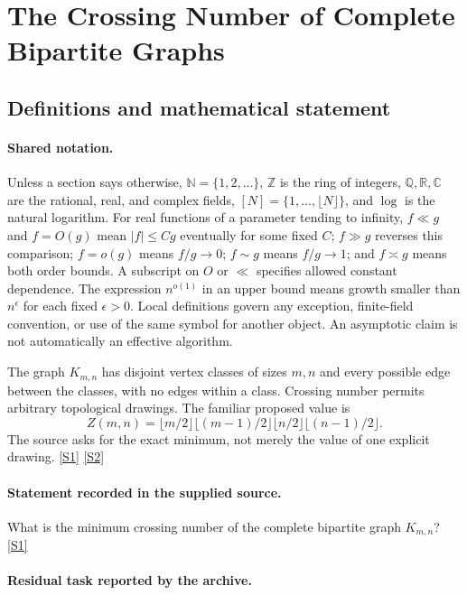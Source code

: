 \documentclass[11pt,a4paper]{article}
\newcommand{\N}{\mathbb{N}}
\newcommand{\Z}{\mathbb{Z}}
\newcommand{\Q}{\mathbb{Q}}
\newcommand{\R}{\mathbb{R}}
\newcommand{\C}{\mathbb{C}}
\newcommand{\sref}[2]{\hyperlink{source:#1:#2}{[S#2]}}
\begin{document}
\section{The Crossing Number of Complete Bipartite Graphs}\label{statement}


\subsection{Definitions and mathematical statement}

\paragraph{Shared notation.}Unless a section says otherwise, $\N=\{1,2,\ldots\}$,
$\Z$ is the ring of integers, $\Q,\R,\C$ are the rational, real, and complex
fields, $[N]=\{1,\ldots,\lfloor N\rfloor\}$, and $\log$ is the natural
logarithm. For real functions of a parameter tending to infinity,
$f\ll g$ and $f=O(g)$ mean $|f|\leq Cg$ eventually for some fixed $C$;
$f\gg g$ reverses this comparison; $f=o(g)$ means $f/g\to0$;
$f\sim g$ means $f/g\to1$; and $f\asymp g$ means both order bounds.
A subscript on $O$ or $\ll$ specifies allowed constant dependence.
The expression $n^{o(1)}$ in an upper bound means growth smaller than
$n^\epsilon$ for each fixed $\epsilon>0$. Local definitions govern any
exception, finite-field convention, or use of the same symbol for another
object. An asymptotic claim is not automatically an effective algorithm.



The graph $K_{m,n}$ has disjoint vertex classes of sizes $m,n$ and every possible edge between the classes, with no edges within a class. Crossing number permits arbitrary topological drawings. The familiar proposed value is
\[Z(m,n)=\lfloor m/2\rfloor\lfloor(m-1)/2\rfloor\lfloor n/2\rfloor\lfloor(n-1)/2\rfloor.\]
The source asks for the exact minimum, not merely the value of one explicit drawing. \sref{statement}{1} \sref{statement}{2}

\paragraph{Statement recorded in the supplied source.}
What is the minimum crossing number of the complete bipartite graph $K_{m,n}$? \sref{statement}{1}

\paragraph{Residual task reported by the archive.}
\end{document}
